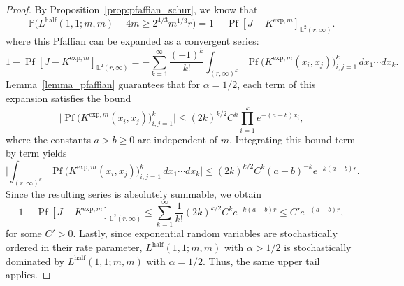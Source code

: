 \documentclass[10pt,a4paper]{amsart}
\newcommand{\Lhalf}{L^{\mathrm{half}}}
\newcommand{\Prob}{\mathbb{P}}
\begin{document}
\begin{proof}
By Proposition~\ref{prop:pfaffian_schur}, we know that
\[
\Prob\big(\Lhalf(1,1;m,m) - 4m \geq 2^{4/3}m^{1/3} r\big)
= 1- \operatorname{Pf}[J - K^{\mathrm{exp},m}]_{\mathbb{L}^2(r,\infty)}.
\]
where this Pfaffian can be expanded as a convergent series:
\[
1 - \operatorname{Pf}[J - K^{\mathrm{exp},m}]_{\mathbb{L}^2(r,\infty)}
= -\sum_{k=1}^{\infty} \frac{(-1)^k}{k!}
\int_{(r,\infty)^k} 
\operatorname{Pf}\!\big(K^{\mathrm{exp},m}(x_i,x_j)\big)_{i,j=1}^{k}
\, dx_1 \cdots dx_k.
\]
Lemma~\ref{lemma_pfaffian} guarantees that for $\alpha = 1/2$, each term of this expansion satisfies the bound
\[
\Big|
\operatorname{Pf}\!\big(K^{\mathrm{exp},m}(x_i,x_j)\big)_{i,j=1}^{k}
\Big|
\le (2k)^{k/2} C^k \prod_{i=1}^{k} e^{-(a-b)x_i},
\]
where the constants $a > b \ge 0$ are independent of $m$. Integrating this bound term by term yields
\[
\Big|
\int_{(r,\infty)^k} 
\operatorname{Pf}\!\big(K^{\mathrm{exp},m}(x_i,x_j)\big)_{i,j=1}^{k}
\, dx_1 \cdots dx_k
\Big|
\le (2k)^{k/2} C^k (a-b)^{-k} e^{-k(a-b)r}.
\]
Since the resulting series is absolutely summable, we obtain
\[
1 - \operatorname{Pf}[J - K^{\mathrm{exp},m}]_{\mathbb{L}^2(r,\infty)}
\le \sum_{k=1}^{\infty} \frac{1}{k!} (2k)^{k/2} C^k e^{-k(a-b)r}
\le C'e^{-(a-b)r},
\]
for some $C'>0$. Lastly, since exponential random variables are stochastically ordered in their rate
parameter, $\Lhalf(1,1;m,m)$ with $\alpha > 1/2$ is stochastically dominated by $\Lhalf(1,1;m,m)$ with $\alpha = 1/2$. Thus, the same upper tail applies.
\end{proof}
\end{document}

